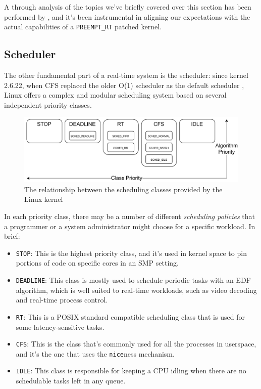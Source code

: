 \documentclass[a4paper,12pt]{report}
\begin{document}
A through analysis of the topics we've briefly covered over this section has been performed by \textcite{survey-preempt-rt}, and it's been instrumental in aligning our expectations with the actual capabilities of a \texttt{PREEMPT\_RT} patched kernel.

\subsection{Scheduler}

The other fundamental part of a real-time system is the scheduler: since kernel 2.6.22, when CFS replaced the older O(1) scheduler as the default scheduler \cite{lwn-cfs-merge}, Linux offers a complex and modular scheduling system based on several independent priority classes. 

\begin{figure}[H]
    \centering
    \includegraphics[width=\textwidth]{img/sched-class.pdf}
    \caption{The relationship between the scheduling classes provided by the Linux kernel}
\end{figure}

In each priority class, there may be a number of different \textit{scheduling policies} that a programmer or a system administrator might choose for a specific workload. In brief: 

\begin{itemize}
    \item \texttt{STOP}: This is the highest priority class, and it's used in kernel space to pin portions of code on specific cores in an SMP setting.
    \item \texttt{DEADLINE}: This class is mostly used to schedule periodic tasks with an EDF algorithm, which is well suited to real-time workloads, such as video decoding and real-time process control.
    \item \texttt{RT}: This is a POSIX standard compatible scheduling class that is used for some latency-sensitive tasks.
    \item \texttt{CFS}: This is the class that's commonly used for all the processes in userspace, and it's the one that uses the \texttt{nice}ness mechanism.
    \item \texttt{IDLE}: This class is responsible for keeping a CPU idling when there are no schedulable tasks left in any queue.
\end{itemize}
\end{document}
